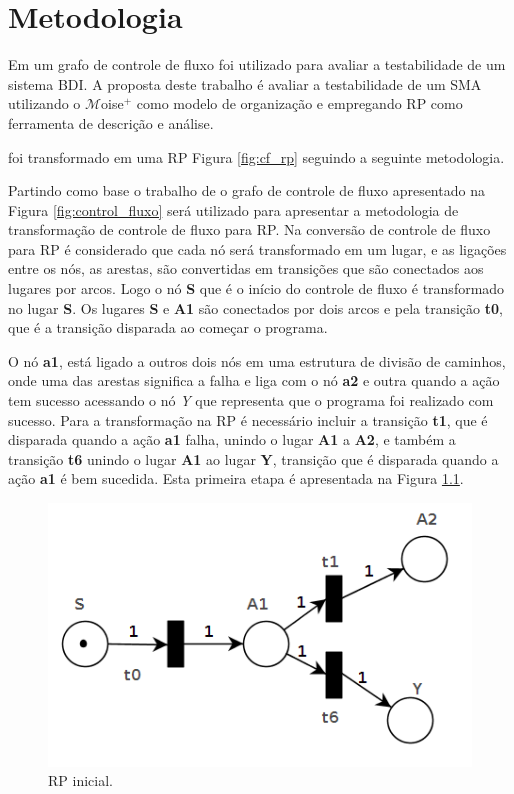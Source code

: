 \chapter{Metodologia}

Em \cite{winikoff2014testability} um grafo de controle de fluxo foi utilizado para avaliar a testabilidade de um sistema BDI. A proposta deste trabalho é avaliar a testabilidade de um SMA utilizando o $\mathcal{M}$oise$^{+}$ como modelo de organização e empregando RP como ferramenta de descrição e análise.  

foi transformado em uma RP Figura \ref{fig:cf_rp} seguindo a seguinte metodologia.



Partindo como base o trabalho de \cite{winikoff2017bdi} o grafo de controle de fluxo apresentado na Figura \ref{fig:control_fluxo} será utilizado para apresentar a metodologia de transformação de controle de fluxo para RP. Na conversão de controle de fluxo para RP é considerado que cada nó será transformado em um lugar, e as ligações entre os nós, as arestas, são convertidas em transições que são conectados aos lugares por arcos. Logo o nó \textbf{S} que é o início do controle de fluxo é transformado no lugar \textbf{S}. Os lugares \textbf{S} e \textbf{A1} são conectados por dois arcos e pela transição \textbf{t0}, que é a transição disparada ao começar o programa.

O nó \textbf{a1}, está ligado a outros dois nós em uma estrutura de divisão de caminhos, onde uma das arestas significa a falha e liga com o nó \textbf{a2} e outra quando a ação tem sucesso acessando o nó \textit{Y} que representa que o programa foi realizado com sucesso. Para a transformação na RP é necessário incluir a transição \textbf{t1}, que é disparada quando a ação \textbf{a1} falha, unindo o lugar \textbf{A1} a \textbf{A2}, e também a transição \textbf{t6} unindo o lugar \textbf{A1} ao lugar \textbf{Y}, transição que é disparada quando a ação \textbf{a1}  é bem sucedida. Esta primeira etapa é apresentada na Figura \ref{fig:4-fluxo-rp0.png}.

\begin{figure}[ht]
    \centering
    \includegraphics[scale=0.4]{imagens/4-fluxo-rp0.png}
    \caption{RP inicial.}
    \label{fig:4-fluxo-rp0.png}
\end{figure}

